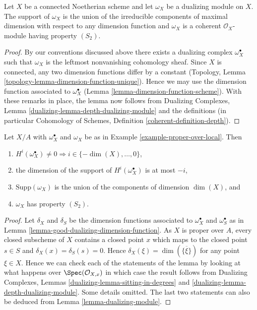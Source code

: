 \begin{lemma}
\label{lemma-dualizing-module}
Let $X$ be a connected Noetherian scheme and let $\omega_X$ be a dualizing
module on $X$. The support of $\omega_X$ is the union of the irreducible
components of maximal dimension with respect to any dimension function
and $\omega_X$ is a coherent $\mathcal{O}_X$-module having property $(S_2)$.
\end{lemma}

\begin{proof}
By our conventions discussed above there exists a dualizing complex
$\omega_X^\bullet$ such that $\omega_X$ is the leftmost nonvanishing
cohomology sheaf. Since $X$ is connected, any two dimension functions
differ by a constant
(Topology, Lemma \ref{topology-lemma-dimension-function-unique}).
Hence we may use the
dimension function associated to $\omega_X^\bullet$
(Lemma \ref{lemma-dimension-function-scheme}).
With these remarks in place, the lemma now
follows from Dualizing Complexes, Lemma
\ref{dualizing-lemma-depth-dualizing-module}
and the definitions (in particular
Cohomology of Schemes, Definition \ref{coherent-definition-depth}).
\end{proof}

\begin{lemma}
\label{lemma-vanishing-good-dualizing}
Let $X/A$ with $\omega_X^\bullet$ and $\omega_X$ be as in
Example \ref{example-proper-over-local}. Then
\begin{enumerate}
\item $H^i(\omega_X^\bullet) \not = 0 \Rightarrow
i \in \{-\dim(X), \ldots, 0\}$,
\item the dimension of the support of $H^i(\omega_X^\bullet)$ is at most $-i$,
\item $\text{Supp}(\omega_X)$ is the union of
the components of dimension $\dim(X)$, and
\item $\omega_X$ has property $(S_2)$.
\end{enumerate}
\end{lemma}

\begin{proof}
Let $\delta_X$ and $\delta_S$ be the dimension functions associated to
$\omega_X^\bullet$ and $\omega_S^\bullet$ as in
Lemma \ref{lemma-good-dualizing-dimension-function}.
As $X$ is proper over $A$, every closed subscheme of $X$ contains
a closed point $x$ which maps to the closed point $s \in S$
and $\delta_X(x) = \delta_S(s) = 0$. Hence
$\delta_X(\xi) = \dim(\overline{\{\xi\}})$ for any point
$\xi \in X$. Hence we can check each of
the statements of the lemma by looking at what happens over
$\Spec(\mathcal{O}_{X, x})$ in which case the result follows
from Dualizing Complexes, Lemmas \ref{dualizing-lemma-sitting-in-degrees} and
\ref{dualizing-lemma-depth-dualizing-module}.
Some details omitted.
The last two statements can also be deduced from
Lemma \ref{lemma-dualizing-module}.
\end{proof}

